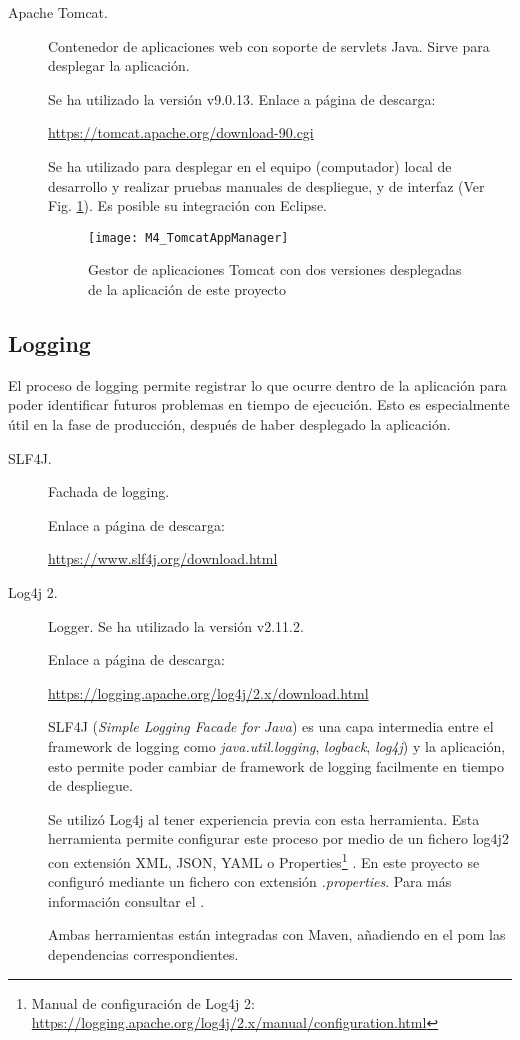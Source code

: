 \begin{description}
	\item[Apache Tomcat.] Contenedor de aplicaciones web con soporte de servlets Java. Sirve para desplegar la aplicación.
	
		Se ha utilizado la versión  v9.0.13. Enlace a página de descarga:
		
		\url{https://tomcat.apache.org/download-90.cgi}
		
		Se ha utilizado para desplegar en el equipo (computador) local de desarrollo y realizar pruebas manuales de despliegue, y de interfaz (Ver Fig. \ref{fig:M4_TomcatAppManager}). Es posible su integración con Eclipse.
		
		\begin{figure}[!h]
			\centering
			\texttt{[image: M4\_TomcatAppManager]}
			\caption{Gestor de aplicaciones Tomcat con dos versiones desplegadas de la aplicación de este proyecto}\label{fig:M4_TomcatAppManager}
		\end{figure}
		\FloatBarrier
		
\end{description}
\subsection{Logging}
El proceso de logging permite registrar lo que ocurre dentro de la aplicación para poder identificar futuros problemas en tiempo de ejecución. Esto es especialmente útil en la fase de producción, después de haber desplegado la aplicación.
\begin{description}
	\item[SLF4J.] Fachada de logging.
	
		Enlace a página de descarga:
	
		\url{https://www.slf4j.org/download.html}
	
	\item[Log4j 2.] Logger. Se ha utilizado la versión  v2.11.2.
	
	 	Enlace a página de descarga:
	
	 	\url{https://logging.apache.org/log4j/2.x/download.html}
	
		SLF4J (\textit{Simple Logging Facade for Java}) es una capa intermedia entre el framework de logging como \textit{java.util.logging}, \textit{logback}, \textit{log4j}) y la aplicación, esto permite poder cambiar de framework de logging facilmente en tiempo de despliegue.
		
		Se utilizó Log4j al tener experiencia previa con esta herramienta. Esta herramienta permite configurar este proceso por medio de un fichero log4j2 con extensión XML, JSON, YAML o Properties\footnote{Manual de configuración de Log4j 2: \url{https://logging.apache.org/log4j/2.x/manual/configuration.html}} \cite{noauthor_log4j_nodate}. En este proyecto se configuró mediante un fichero con extensión \textit{.properties}. Para más información consultar el . 
		
		Ambas herramientas están integradas con Maven, añadiendo en el pom las dependencias correspondientes.
	
\end{description}
